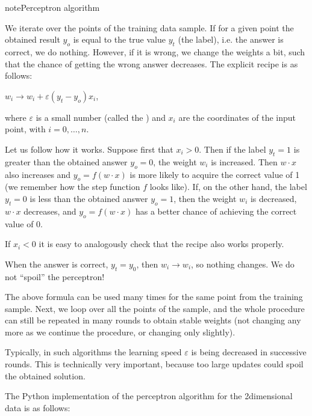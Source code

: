 \documentclass[letterpaper,10pt,english]{jupyterBook}
\begin{document}
\begin{sphinxadmonition}{note}{Perceptron algorithm}

\sphinxAtStartPar
We iterate over the points of the training data sample.
If for a given point  the obtained result \(y_o\) is equal to the true value \(y_t\) (the label), i.e. the answer is  correct, we do nothing. However, if it is wrong, we change the weights a bit, such that the chance of getting the wrong answer decreases. The explicit recipe is as follows:

\sphinxAtStartPar
\(w_i \to w_i  +  \varepsilon  (y_t - y_o)  x_i\),

\sphinxAtStartPar
where \( \varepsilon \) is a small number (called the ) and \(x_i\) are the coordinates of the input point, with \(i=0,\dots,n\).
\end{sphinxadmonition}

\sphinxAtStartPar
Let us follow how it works. Suppose first that \( x_i> 0\). Then if the label \( y_t = 1 \) is greater than the obtained answer \( y_o = 0\), the weight \(w_i\) is increased. Then \( w \cdot x \) also increases and \( y_o = f (w \cdot x) \) is more likely to acquire the correct value of 1 (we remember how the step function \(f\) looks like). If, on the other hand, the label \( y_t = 0 \) is less than the obtained answer \( y_o = 1 \), then the weight \(w_i\) is decreased, \( w \cdot x \) decreases, and \( y_o = f (w \cdot x) \) has a better chance of achieving the correct value of 0.

\sphinxAtStartPar
If \( x_i < 0 \) it is easy to analogously check that the recipe also works properly.

\sphinxAtStartPar
When the answer is correct, \(y_t=y_0\), then \( w_i \to w_i\), so nothing changes. We do not “spoil” the perceptron!

\sphinxAtStartPar
The above formula can be used many times for the same point from the training sample. Next,  we loop over all the points of the sample, and the whole procedure can still be repeated in many rounds to obtain stable weights (not changing any more as we continue the procedure, or changing only slightly).

\sphinxAtStartPar
Typically, in such algorithms the learning speed \( \varepsilon \) is being decreased in successive rounds. This is technically very important, because too large updates could spoil the obtained solution.

\sphinxAtStartPar
The Python implementation of the perceptron algorithm for the 2\sphinxhyphen{}dimensional data is as follows:
\end{document}
